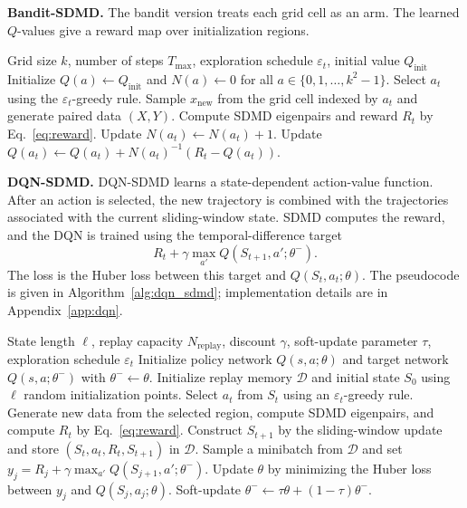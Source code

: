 \documentclass{article}
\numberwithin{equation}{section}
\theoremstyle{definition}
\newcommand{\init}{\text{init}}
\newcommand{\new}{\text{new}}
\begin{document}
\textbf{Bandit-SDMD.}
The bandit version treats each grid cell as an arm. The learned $Q$-values give a reward map over initialization regions.
\begin{algorithm}
\caption{Multi-Armed Bandit with SDMD}
\label{alg:bandit_sdmd}
\begin{algorithmic}[1]
\Require Grid size $k$, number of steps $T_{\max}$, exploration schedule $\varepsilon_t$, initial value $Q_{\init}$
\State Initialize $Q(a)\leftarrow Q_{\init}$ and $N(a)\leftarrow0$ for all $a\in\{0,1,\ldots,k^2-1\}$.
    \State Select $a_t$ using the $\varepsilon_t$-greedy rule.
    \State Sample $x_{\new}$ from the grid cell indexed by $a_t$ and generate paired data $(X,Y)$.
    \State Compute SDMD eigenpairs and reward $R_t$ by Eq.~\eqref{eq:reward}.
    \State Update $N(a_t)\leftarrow N(a_t)+1$.
    \State Update $Q(a_t)\leftarrow Q(a_t)+N(a_t)^{-1}(R_t-Q(a_t))$.
\EndFor
\end{algorithmic}
\end{algorithm}

\textbf{DQN-SDMD.}
DQN-SDMD learns a state-dependent action-value function. After an action is selected, the new trajectory is combined with the trajectories associated with the current sliding-window state. SDMD computes the reward, and the DQN is trained using the temporal-difference target
\begin{equation*}
    R_t+\gamma\max_{a'}Q(S_{t+1},a';\theta^-).
\end{equation*}
The loss is the Huber loss between this target and $Q(S_t,a_t;\theta)$. The pseudocode is given in Algorithm~\ref{alg:dqn_sdmd}; implementation details are in Appendix~\ref{app:dqn}.
\begin{algorithm}
\caption{DQN with SDMD}
\label{alg:dqn_sdmd}
\begin{algorithmic}[1]
\Require State length $\ell$, replay capacity $N_{\mathrm{replay}}$, discount $\gamma$, soft-update parameter $\tau$, exploration schedule $\varepsilon_t$
\State Initialize policy network $Q(s,a;\theta)$ and target network $Q(s,a;\theta^-)$ with $\theta^-\leftarrow\theta$.
\State Initialize replay memory $\mathcal{D}$ and initial state $S_0$ using $\ell$ random initialization points.
    \State Select $a_t$ from $S_t$ using an $\varepsilon_t$-greedy rule.
    \State Generate new data from the selected region, compute SDMD eigenpairs, and compute $R_t$ by Eq.~\eqref{eq:reward}.
    \State Construct $S_{t+1}$ by the sliding-window update and store $(S_t,a_t,R_t,S_{t+1})$ in $\mathcal{D}$.
    \State Sample a minibatch from $\mathcal{D}$ and set $y_j=R_j+\gamma\max_{a'}Q(S_{j+1},a';\theta^-)$.
    \State Update $\theta$ by minimizing the Huber loss between $y_j$ and $Q(S_j,a_j;\theta)$.
    \State Soft-update $\theta^-\leftarrow\tau\theta+(1-\tau)\theta^-$.
\EndFor
\end{algorithmic}
\end{algorithm}
\end{document}
